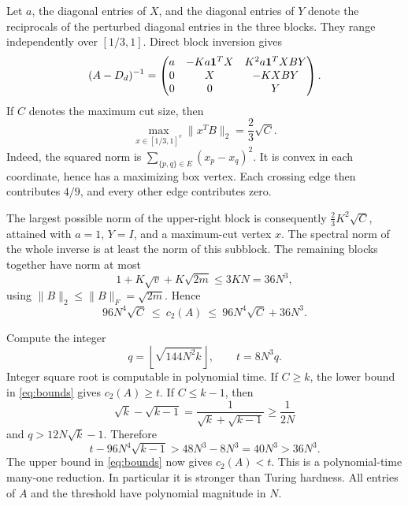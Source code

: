 Let $a$, the diagonal entries of $X$, and the diagonal entries of $Y$ denote the reciprocals of the perturbed diagonal entries in the three blocks. They range independently over $[1/3,1]$. Direct block inversion gives
\[
 (A-D_d)^{-1}=
 \begin{pmatrix}
 a&-Ka\mathbf 1^TX&K^2a\mathbf 1^TXBY\\
 0&X&-KXBY\\
 0&0&Y
 \end{pmatrix}.
\]
If $C$ denotes the maximum cut size, then
\begin{equation}\label{eq:cut}
 \max_{x\in[1/3,1]^v}\|x^TB\|_2=\frac23\sqrt C.
\end{equation}
Indeed, the squared norm is $\sum_{\{p,q\}\in E}(x_p-x_q)^2$. It is convex in each coordinate, hence has a maximizing box vertex. Each crossing edge then contributes $4/9$, and every other edge contributes zero.

The largest possible norm of the upper-right block is consequently $\frac23K^2\sqrt C$, attained with $a=1$, $Y=I$, and a maximum-cut vertex $x$. The spectral norm of the whole inverse is at least the norm of this subblock. The remaining blocks together have norm at most
\[
 1+K\sqrt v+K\sqrt{2m}\le3KN=36N^3,
\]
using $\|B\|_2\le\|B\|_F=\sqrt{2m}$. Hence
\begin{equation}\label{eq:bounds}
 96N^4\sqrt C\ \le\ c_2(A)\ \le\ 96N^4\sqrt C+36N^3.
\end{equation}

Compute the integer
\[
 q=\left\lfloor\sqrt{144N^2k}\right\rfloor,\qquad t=8N^3q.
\]
Integer square root is computable in polynomial time. If $C\ge k$, the lower bound in \eqref{eq:bounds} gives $c_2(A)\ge t$. If $C\le k-1$, then
\[
 \sqrt k-\sqrt{k-1}=\frac1{\sqrt k+\sqrt{k-1}}\ge\frac1{2N}
\]
and $q>12N\sqrt k-1$. Therefore
\[
 t-96N^4\sqrt{k-1}>48N^3-8N^3=40N^3>36N^3.
\]
The upper bound in \eqref{eq:bounds} now gives $c_2(A)<t$. This is a polynomial-time many-one reduction. In particular it is stronger than Turing hardness. All entries of $A$ and the threshold have polynomial magnitude in $N$.
